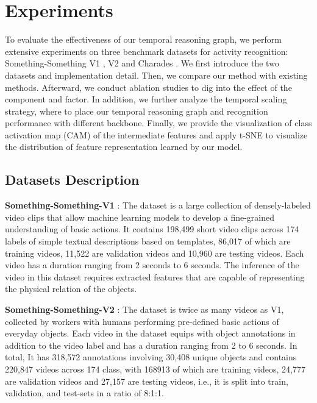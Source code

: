 \documentclass[conference,compsoc]{IEEEtran}
\begin{document}
\section{Experiments}
\label{sec:experiments}

    To evaluate the effectiveness of our temporal reasoning graph, we perform extensive experiments on three benchmark datasets for activity recognition: Something-Something V1 \cite{goyal2017something}, V2 \cite{mahdisoltani2018fine} and Charades \cite{sigurdsson2016hollywood}. We first introduce the two datasets and implementation detail. Then, we compare our method with existing methods. Afterward, we conduct ablation studies to dig into the effect of the component and factor. In addition, we further analyze the temporal scaling strategy, where to place our temporal reasoning graph and recognition performance with different backbone. Finally, we provide the visualization of class activation map (CAM) \cite{zhou2016learning} of the intermediate features and apply t-SNE \cite{dermaaten2008visualizing} to visualize the distribution of feature representation learned by our model.


\subsection{Datasets Description}
    \textbf{Something-Something-V1} \cite{goyal2017something}: The dataset is a large collection of densely-labeled video clips that allow machine learning models to develop a fine-grained understanding of basic actions. It contains 198,499 short video clips across 174 labels of simple textual descriptions based on templates, 86,017 of which are training videos, 11,522 are validation videos and 10,960 are testing videos. Each video has a duration ranging from 2 seconds to 6 seconds. The inference of the video in this dataset requires extracted features that are capable of representing the physical relation of the objects. 
    
    \textbf{Something-Something-V2} \cite{mahdisoltani2018fine}: The dataset is twice as many videos as V1, collected by workers with humans performing pre-defined basic actions of everyday objects. Each video in the dataset equips with object annotations in addition to the video label and has a duration ranging from 2 to 6 seconds. In total, It has 318,572 annotations involving 30,408 unique objects and contains 220,847 videos across 174 class, with 168913 of which are training videos, 24,777 are validation videos and 27,157 are testing videos, i.e., it is split into train, validation, and test-sets in a ratio of 8:1:1.
    
\end{document}
